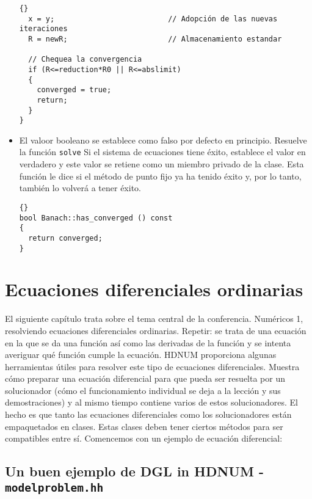 \documentclass[a4paper,11pt]{article}
\theoremstyle{definition}
\begin{document}
\begin{itemize}
{{\begin{lstlisting}{}
  x = y;                          // Adopción de las nuevas iteraciones 
  R = newR;                       // Almacenamiento estandar

  // Chequea la convergencia
  if (R<=reduction*R0 || R<=abslimit)
  {
    converged = true;
    return;
  }
}
\end{lstlisting}}}

\item El valoor booleano se establece como falso por defecto en principio.  Resuelve la función 
 \lstinline{solve} Si el sistema de ecuaciones tiene éxito, establece el valor en verdadero y este valor se retiene como un miembro privado de la clase. Esta función le dice si el método de punto fijo ya ha tenido éxito y, por lo tanto, también lo volverá a tener éxito.

{\footnotesize{\begin{lstlisting}{}
bool Banach::has_converged () const
{
  return converged;
}
\end{lstlisting}}}
\end{itemize}



\section{Ecuaciones diferenciales ordinarias}

El siguiente capítulo trata sobre el tema central de la conferencia.
Numéricos 1, resolviendo ecuaciones diferenciales ordinarias. Repetir: se trata de una ecuación en la que se da una función así como las derivadas de la función y se intenta averiguar qué función cumple la ecuación. HDNUM proporciona algunas herramientas útiles para resolver este tipo de ecuaciones diferenciales. Muestra cómo preparar una ecuación diferencial para que pueda ser resuelta por un solucionador (cómo el funcionamiento individual se deja a la lección y sus demostraciones) y al mismo tiempo contiene varios de estos solucionadores. El hecho es que tanto las ecuaciones diferenciales como los solucionadores están empaquetados en clases. Estas clases deben tener ciertos métodos para ser compatibles entre sí. Comencemos con un ejemplo de ecuación diferencial:

\subsection{Un buen ejemplo de DGL in HDNUM - \lstinline{modelproblem.hh}}
\end{document}
